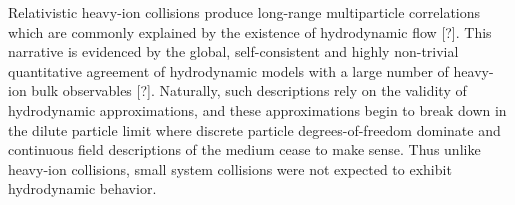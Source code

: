 \documentclass[aps,prc,reprint,amsmath,nofootinbib]{revtex4-1}
\newcommand{\note}{\textcolor{theblue}{[?]}}
\begin{document}
Relativistic heavy-ion collisions produce long-range multiparticle correlations which are commonly explained by the existence of hydrodynamic flow \note.
This narrative is evidenced by the global, self-consistent and highly non-trivial quantitative agreement of hydrodynamic models with a large number of heavy-ion bulk observables \note.
Naturally, such descriptions rely on the validity of hydrodynamic approximations, and these approximations begin to break down in the dilute particle limit where discrete particle degrees-of-freedom dominate and continuous field descriptions of the medium cease to make sense.
Thus unlike heavy-ion collisions, small system collisions were not expected to exhibit hydrodynamic behavior.

%
%
%
%
%
%
%
\end{document}
